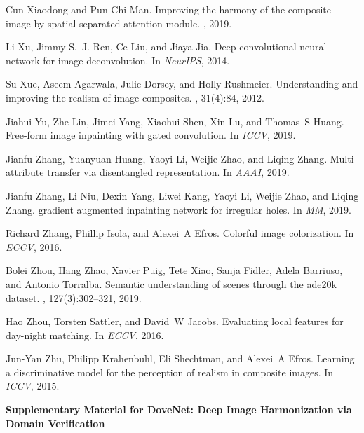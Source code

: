 \documentclass[10pt,twocolumn,letterpaper]{article}
\begin{document}
\begin{thebibliography}{10}
Cun Xiaodong and Pun Chi-Man.
\newblock Improving the harmony of the composite image by spatial-separated
  attention module.
, 2019.

Li Xu, Jimmy S.~J. Ren, Ce Liu, and Jiaya Jia.
\newblock Deep convolutional neural network for image deconvolution.
\newblock In {\em NeurIPS}, 2014.

Su Xue, Aseem Agarwala, Julie Dorsey, and Holly Rushmeier.
\newblock Understanding and improving the realism of image composites.
, 31(4):84, 2012.

Jiahui Yu, Zhe Lin, Jimei Yang, Xiaohui Shen, Xin Lu, and Thomas~S Huang.
\newblock Free-form image inpainting with gated convolution.
\newblock In {\em ICCV}, 2019.

Jianfu Zhang, Yuanyuan Huang, Yaoyi Li, Weijie Zhao, and Liqing Zhang.
\newblock Multi-attribute transfer via disentangled representation.
\newblock In {\em AAAI}, 2019.

Jianfu Zhang, Li Niu, Dexin Yang, Liwei Kang, Yaoyi Li, Weijie Zhao, and Liqing
  Zhang.
 gradient augmented inpainting network for irregular holes.
\newblock In {\em MM}, 2019.

Richard Zhang, Phillip Isola, and Alexei~A Efros.
\newblock Colorful image colorization.
\newblock In {\em ECCV}, 2016.

Bolei Zhou, Hang Zhao, Xavier Puig, Tete Xiao, Sanja Fidler, Adela Barriuso,
  and Antonio Torralba.
\newblock Semantic understanding of scenes through the ade20k dataset.
, 127(3):302--321,
  2019.

Hao Zhou, Torsten Sattler, and David~W Jacobs.
\newblock Evaluating local features for day-night matching.
\newblock In {\em ECCV}, 2016.

Jun-Yan Zhu, Philipp Krahenbuhl, Eli Shechtman, and Alexei~A Efros.
\newblock Learning a discriminative model for the perception of realism in
  composite images.
\newblock In {\em ICCV}, 2015.

\end{thebibliography}


\pagebreak
\clearpage
\begin{center}
\textbf{\large Supplementary Material for DoveNet: Deep Image Harmonization via Domain Verification}
\end{center}
\setcounter{equation}{0}
\setcounter{section}{0}
\setcounter{figure}{0}
\setcounter{table}{0}
\setcounter{page}{1}
\makeatletter
\renewcommand{\thesection}{S\arabic{section}}
\renewcommand{\theequation}{S\arabic{equation}}
\renewcommand{\thefigure}{S\arabic{figure}}
\renewcommand{\thetable}{S\arabic{table}}
\renewcommand{\bibnumfmt}[1]{[S#1]}
\renewcommand{\citenumfont}[1]{S#1}
\end{document}
